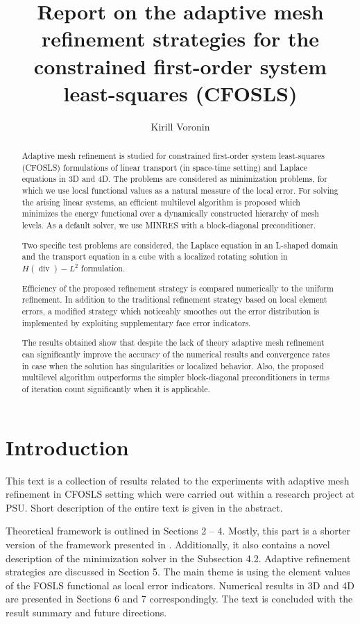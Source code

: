 \documentclass[a4paper,12pt]{amsart}
\title[Report on adaptive mesh refinement in CFOSLS] 
{Report on the adaptive mesh refinement strategies for the constrained first-order system least-squares (CFOSLS)}
\author{Kirill Voronin}
\numberwithin{equation}{section}
\renewcommand{\div}{\operatorname{div}}
\begin{document}
 
\begin{abstract}
Adaptive mesh refinement is studied for constrained first-order system least-squares (CFOSLS) formulations of linear transport (in space-time setting) and Laplace equations in 3D and 4D. The problems are considered as minimization problems, for which we use local functional values as a natural measure of the local error. For solving the arising linear systems, an efficient multilevel algorithm is proposed which minimizes the energy functional over a dynamically constructed hierarchy of mesh levels. As a default solver, we use MINRES with a block-diagonal preconditioner.

Two specific test problems are considered, the Laplace equation in an L-shaped domain and the transport equation in a cube with a localized rotating solution in $H(\div)-L^2$ formulation.

Efficiency of the proposed refinement strategy is compared numerically to the uniform refinement. In addition to the traditional refinement strategy based on local element errors, a modified strategy which noticeably smoothes out the error distribution is implemented by exploiting supplementary face error indicators.

The results obtained show that despite the lack of theory adaptive mesh refinement can significantly improve the accuracy of the numerical results and convergence rates in case when the solution has singularities or localized behavior. Also, the proposed multilevel algorithm outperforms the simpler block-diagonal preconditioners in terms of iteration count significantly when it is applicable.
\end{abstract}
\maketitle

\section{Introduction}

This text is a collection of results related to the experiments with adaptive mesh refinement in CFOSLS setting which were carried out within a research project at PSU.
Short description of the entire text is given in the abstract.

Theoretical framework is outlined in Sections 2 -- 4. Mostly, this part is a shorter version of the framework presented in \cite{our_cfosls_paper}. Additionally, it also contains a novel description of the minimization solver in the Subsection 4.2.
Adaptive refinement strategies are discussed in Section 5. The main theme is using the element values of the FOSLS functional as local error indicators.
Numerical results in 3D and 4D are presented in Sections 6 and 7 correspondingly.
The text is concluded with the result summary and future directions.
\end{document}
